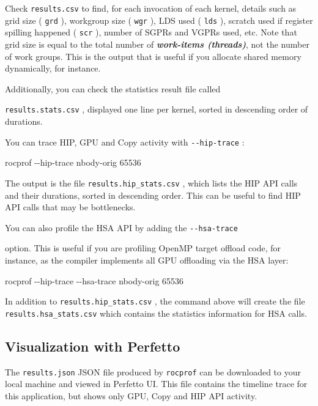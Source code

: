 \documentclass[
]{article}
\let\oldtexttt\texttt
\renewcommand{\texttt}[1]{
  \colorbox{Light}{\oldtexttt{#1}}
}
\newenvironment{Shaded}{}{}
\newcommand{\ExtensionTok}[1]{#1}
\newcommand{\NormalTok}[1]{#1}
\begin{document}
Check \texttt{results.csv} to find, for each invocation of each kernel,
details such as grid size (\texttt{grd}), workgroup size (\texttt{wgr}),
LDS used (\texttt{lds}), scratch used if register spilling happened
(\texttt{scr}), number of SGPRs and VGPRs used, etc. Note that grid size
is equal to the total number of \textbf{\emph{work-items (threads)}},
not the number of work groups. This is the output that is useful if you
allocate shared memory dynamically, for instance.

Additionally, you can check the statistics result file called
\texttt{results.stats.csv}, displayed one line per kernel, sorted in
descending order of durations.

You can trace HIP, GPU and Copy activity with \texttt{-\/-hip-trace}:

\begin{Shaded}
\begin{Highlighting}[]
\ExtensionTok{rocprof}\NormalTok{ {-}{-}hip{-}trace nbody{-}orig 65536}
\end{Highlighting}
\end{Shaded}

The output is the file \texttt{results.hip\_stats.csv}, which lists the
HIP API calls and their durations, sorted in descending order. This can
be useful to find HIP API calls that may be bottlenecks.

You can also profile the HSA API by adding the \texttt{-\/-hsa-trace}
option. This is useful if you are profiling OpenMP target offload code,
for instance, as the compiler implements all GPU offloading via the HSA
layer:

\begin{Shaded}
\begin{Highlighting}[]
\ExtensionTok{rocprof}\NormalTok{ {-}{-}hip{-}trace {-}{-}hsa{-}trace nbody{-}orig 65536}
\end{Highlighting}
\end{Shaded}

In addition to\texttt{results.hip\_stats.csv}, the command above will
create the file \texttt{results.hsa\_stats.csv} which contains the
statistics information for HSA calls.

\hypertarget{visualization-with-perfetto}{%
\subsection{Visualization with
Perfetto}\label{visualization-with-perfetto}}

The \texttt{results.json} JSON file produced by \texttt{rocprof} can be
downloaded to your local machine and viewed in Perfetto UI. This file
contains the timeline trace for this application, but shows only GPU,
Copy and HIP API activity.
\end{document}
